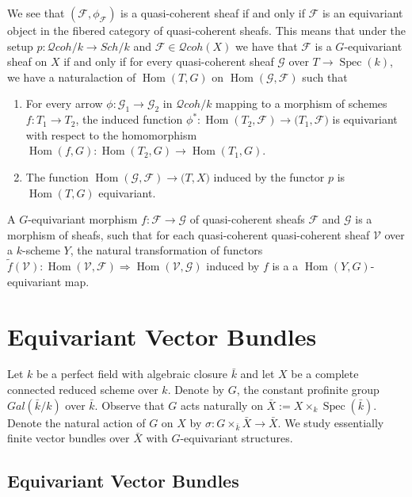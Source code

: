 \documentclass{article}
\newcommand{\spec}[1]{\operatorname{Spec}(#1)}
\newcommand{\Hom}{\operatorname{Hom}}
\begin{document}
We see that $(\mathcal F,\phi_{\mathcal F})$ is a quasi-coherent sheaf if and only if $\mathcal F$ is an equivariant
object in the fibered category of quasi-coherent sheafs. This means that under the setup 
$p:\mathcal Qcoh/k \rightarrow Sch/k$ and $\mathcal F \in \mathcal Qcoh(X)$ we have that $\mathcal F$ is a 
$G$-equivariant sheaf on $X$ if and only if for every quasi-coherent sheaf $\mathcal G$ over $T \rightarrow \spec k$,
we have a naturalaction of $\Hom(T,G)$ on $\Hom(\mathcal G,\mathcal F)$ such that
\begin{enumerate}
  \item For every arrow $\phi:\mathcal G_1 \rightarrow \mathcal G_2$ in $\mathcal Qcoh/k$ mapping to a morphism of 
    schemes $f:T_1 \rightarrow T_2$, the induced function 
    $\phi^*: \Hom(T_2,\mathcal F) \rightarrow \mathcal (T_1,\mathcal F)$ is equivariant with respect to the 
    homomorphism $\Hom(f,G):\Hom (T_2,G) \rightarrow \Hom (T_1,G)$.
  \item The function $\Hom (\mathcal G,\mathcal F) \rightarrow \mathcal (T,X)$ induced by the functor $p$ is 
    $\Hom(T,G)$ equivariant.
\end{enumerate}
A $G$-equivariant morphism $f:\mathcal F \rightarrow \mathcal G$ of quasi-coherent sheafs
$\mathcal F$ and $\mathcal G$ is a morphism of sheafs, such that for each quasi-coherent quasi-coherent sheaf
$\mathcal V$ over a $k$-scheme $Y$, the natural transformation of functors
$\tilde f(\mathcal V): \Hom(\mathcal V,\mathcal F) \Rightarrow \Hom(\mathcal V,\mathcal G)$ induced by $f$ is a 
a $\Hom(Y,G)$-equivariant map.

\section{Equivariant Vector Bundles} 

Let $k$ be a perfect field with algebraic closure $\bar k$ and let $X$ be a complete connected reduced scheme over $k$.
Denote by $G$, the constant profinite group $Gal(\bar k / k)$ over $\bar k$. Observe that $G$ acts naturally on 
$\bar X := X \times _k \spec {\bar k}$. Denote the natural action of $G$ on $X$ by 
$\sigma: G \times _{\bar k} \bar X \rightarrow \bar X$. We study essentially finite vector bundles over $\bar X$ with 
$G$-equivariant structures.

\subsection{Equivariant Vector Bundles}
\label{sec:Equivariant Vector Bundles}
\end{document}
